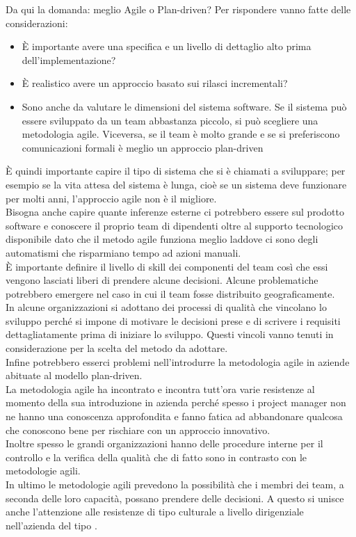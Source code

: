 Da qui la domanda: meglio Agile o Plan-driven?
Per rispondere vanno fatte delle considerazioni:
\begin{itemize}[noitemsep]
    \item È importante avere una specifica e un livello di dettaglio alto prima dell'implementazione?
    \item È realistico avere un approccio basato sui rilasci incrementali?
    \item Sono anche da valutare le dimensioni del sistema software. Se il sistema può essere sviluppato da un team abbastanza piccolo, si può scegliere una metodologia agile. Viceversa, se il team è molto grande e se si preferiscono comunicazioni formali è meglio un approccio plan-driven
\end{itemize}
È quindi importante capire il tipo di sistema che si è chiamati a sviluppare; per esempio se la vita attesa del sistema è lunga, cioè se un sistema deve funzionare per molti anni, l'approccio agile non è il migliore.\\
Bisogna anche capire quante inferenze esterne ci potrebbero essere sul prodotto software e conoscere il proprio team di dipendenti oltre al supporto tecnologico disponibile dato che il metodo agile funziona meglio laddove ci sono degli automatismi che risparmiano tempo ad azioni manuali.\\
È importante definire il livello di skill dei componenti del team così che essi vengono lasciati liberi di prendere alcune decisioni.
Alcune problematiche potrebbero emergere nel caso in cui il team fosse distribuito geograficamente.\\
In alcune organizzazioni si adottano dei processi di qualità che vincolano lo sviluppo perché si impone di motivare le decisioni prese e di scrivere i requisiti dettagliatamente prima di iniziare lo sviluppo.
Questi vincoli vanno tenuti in considerazione per la scelta del metodo da adottare.\\
Infine potrebbero esserci problemi nell'introdurre la metodologia agile in aziende abituate al modello plan-driven.\\
La metodologia agile ha incontrato e incontra tutt'ora varie resistenze al momento della sua introduzione in azienda perché spesso i project manager non ne hanno una conoscenza approfondita e fanno fatica ad abbandonare qualcosa che conoscono bene per rischiare con un approccio innovativo.\\
Inoltre spesso le grandi organizzazioni hanno delle procedure interne per il controllo e la verifica della qualità che di fatto sono in contrasto con le metodologie agili.\\
In ultimo le metodologie agili prevedono la possibilità che i membri dei team, a seconda delle loro capacità, possano prendere delle decisioni.
A questo si unisce anche l'attenzione alle resistenze di tipo culturale a livello dirigenziale nell'azienda del tipo .